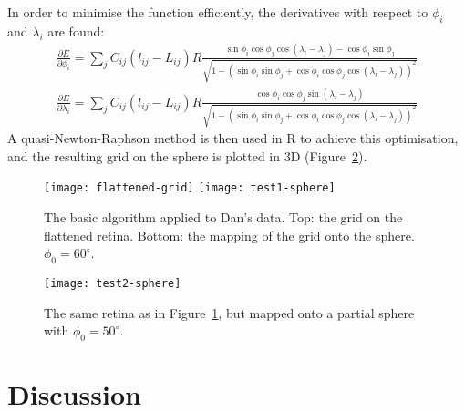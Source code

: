 \documentclass{article}
\begin{document}
In order to minimise the function efficiently, the derivatives with
respect to $\phi_i$ and $\lambda_i$ are found:
\begin{equation}
  \label{fold-sphere:eq:3}
  \begin{split}
    \frac{\partial E}{\partial\phi_i} = 
    \sum_j C_{ij} (l_{ij} - L_{ij})R
    \frac{\sin\phi_i\cos\phi_j\cos(\lambda_i-\lambda_j) - \cos\phi_i\sin\phi_j}
    {\sqrt{1-(\sin\phi_i\sin\phi_j +
        \cos\phi_i\cos\phi_j\cos(\lambda_i-\lambda_j))^2}} \\
    \frac{\partial E}{\partial\lambda_i} = 
    \sum_j C_{ij} (l_{ij} - L_{ij})R
    \frac{\cos\phi_i\cos\phi_j\sin(\lambda_i-\lambda_j)}
    {\sqrt{1-(\sin\phi_i\sin\phi_j + \cos\phi_i\cos\phi_j\cos(\lambda_i-\lambda_j))^2}}
  \end{split}
\end{equation}
A quasi-Newton-Raphson method is then used in R to achieve this
optimisation, and the resulting grid on the sphere is plotted in 3D
(Figure~\ref{fold-sphere:fig:test2}).



\begin{figure}
  \centering
  \texttt{[image: flattened-grid]}
  \texttt{[image: test1-sphere]}
  \caption{The basic algorithm applied to Dan's data. Top: the grid on
    the flattened retina. Bottom: the mapping of the grid onto the
    sphere. $\phi_0= 60^\circ$.}
  \label{fold-sphere:fig:test1}
\end{figure}

\begin{figure}
  \centering
  \texttt{[image: test2-sphere]}
  \caption{The same retina as in Figure~\ref{fold-sphere:fig:test1},
    but mapped onto a partial sphere with $\phi_0= 50^\circ$.}
  \label{fold-sphere:fig:test2}
\end{figure}


\section{Discussion}
\label{fold-retina:sec:discussion}
\end{document}
